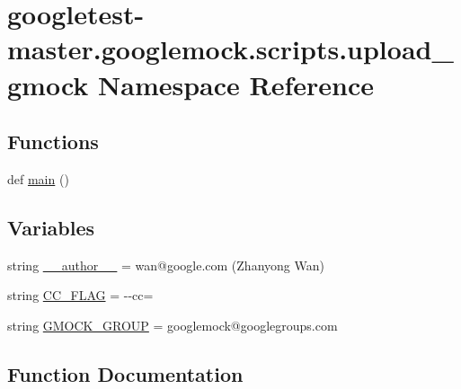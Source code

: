 \hypertarget{namespacegoogletest-master_1_1googlemock_1_1scripts_1_1upload__gmock}{}\section{googletest-\/master.googlemock.\+scripts.\+upload\+\_\+gmock Namespace Reference}
\label{namespacegoogletest-master_1_1googlemock_1_1scripts_1_1upload__gmock}
\subsection*{Functions}
\begin{DoxyCompactItemize}
\item 
def \mbox{\hyperlink{namespacegoogletest-master_1_1googlemock_1_1scripts_1_1upload__gmock_a3c40901192a7df065a98ddbdbc25155a}{main}} ()
\end{DoxyCompactItemize}
\subsection*{Variables}
\begin{DoxyCompactItemize}
\item 
string \mbox{\hyperlink{namespacegoogletest-master_1_1googlemock_1_1scripts_1_1upload__gmock_a2e3ad151696c95117da3b37c5c1b2289}{\+\_\+\+\_\+author\+\_\+\+\_\+}} = \textquotesingle{}wan@google.\+com (Zhanyong Wan)\textquotesingle{}
\item 
string \mbox{\hyperlink{namespacegoogletest-master_1_1googlemock_1_1scripts_1_1upload__gmock_ac7626eddec398f84234dc6d992285a72}{C\+C\+\_\+\+F\+L\+AG}} = \textquotesingle{}-\/-\/cc=\textquotesingle{}
\item 
string \mbox{\hyperlink{namespacegoogletest-master_1_1googlemock_1_1scripts_1_1upload__gmock_ac16ff3118c2930a0f956c29dc0751e7d}{G\+M\+O\+C\+K\+\_\+\+G\+R\+O\+UP}} = \textquotesingle{}googlemock@googlegroups.\+com\textquotesingle{}
\end{DoxyCompactItemize}


\subsection{Function Documentation}
\mbox{\label{namespacegoogletest-master_1_1googlemock_1_1scripts_1_1upload__gmock_a3c40901192a7df065a98ddbdbc25155a}} 
